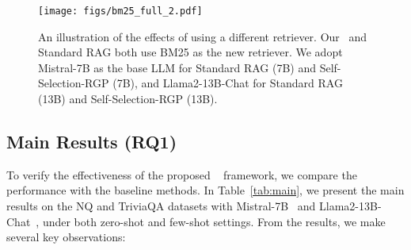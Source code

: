 \begin{figure*}[t]
\setlength\abovecaptionskip{0px}
\setlength\belowcaptionskip{0px}
  \centering
  \texttt{[image: figs/bm25\_full\_2.pdf]}
  \caption{An illustration of the effects of using a different retriever. Our \approach~and Standard RAG both use BM25 as the new retriever. We adopt Mistral-7B as the base LLM for Standard RAG (7B) and Self-Selection-RGP (7B), and Llama2-13B-Chat for Standard RAG (13B) and Self-Selection-RGP (13B). } 
  \label{fig:retriever}
\end{figure*}
\subsection{Main Results (RQ1)}
\label{sec:main-result}

To verify the effectiveness of the proposed \framework~ framework, we compare the performance with the baseline methods.
In Table~\ref{tab:main}, we present the main results on the NQ and TriviaQA datasets with Mistral-7B~\cite{jiang2023mistral7b} and Llama2-13B-Chat~\cite{Touvron2023LLaMA}, under both zero-shot and few-shot settings. 
From the results, we make several key observations: 

